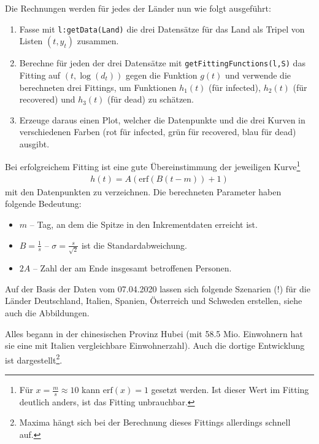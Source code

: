 \documentclass[a4paper,11pt]{article}
\newcommand{\br}[1]{\left(#1\right)}
\newcommand{\erf}{\mathrm{erf}}
\begin{document}
Die Rechnungen werden für jedes der Länder nun wie folgt ausgeführt:
\begin{enumerate}
\item Fasse mit \texttt{l:getData(Land)} die drei Datensätze für das Land als
  Tripel von Listen $(t,y_t)$ zusammen.
\item Berechne für jeden der drei Datensätze mit
  \texttt{getFittingFunctions(l,S)} das Fitting auf $(t,\log(d_t))$ gegen die
  Funktion $g(t)$ und verwende die berechneten drei Fittings, um Funktionen
  $h_1(t)$ (für infected), $h_2(t)$ (für recovered) und $h_3(t)$ (für dead) zu
  schätzen.
\item Erzeuge daraus einen Plot, welcher die Datenpunkte und die drei Kurven
  in verschiedenen Farben (rot für infected, grün für recovered, blau für
  dead) ausgibt.  
\end{enumerate}
Bei erfolgreichem Fitting ist eine gute Übereinstimmung der jeweiligen
Kurve\footnote{Für $x=\frac{m}{s}\approx 10$ kann $\erf(x)=1$ gesetzt werden.
Ist dieser Wert im Fitting deutlich anders, ist das Fitting unbrauchbar.}
\begin{gather*}
  h(t)=A\br{\erf\br{B(t-m)}+1}
\end{gather*}
mit den Datenpunkten zu verzeichnen.  Die berechneten Parameter haben folgende
Bedeutung:
\begin{itemize}
\item $m$ -- Tag, an dem die Spitze in den Inkrementdaten erreicht ist.
\item $B=\frac{1}{s}$ -- $\sigma=\frac{s}{\sqrt{2}}$ ist die
  Standardabweichung.
\item $2A$ -- Zahl der am Ende insgesamt betroffenen Personen. 
\end{itemize}

Auf der Basis der Daten vom 07.04.2020 lassen sich folgende Szenarien (!) für
die Länder Deutschland, Italien, Spanien, Österreich und Schweden erstellen,
siehe auch die Abbildungen.

Alles begann in der chinesischen Provinz Hubei (mit 58.5 Mio. Einwohnern hat
sie eine mit Italien vergleichbare Einwohnerzahl).  Auch die dortige
Entwicklung ist dargestellt\footnote{Maxima hängt sich bei der Berechnung
  dieses Fittings allerdings schnell auf.}.
\end{document}
